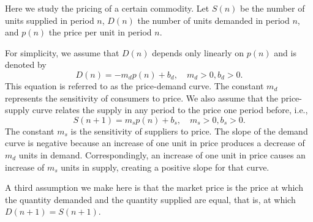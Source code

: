 \begin{eg}
Here we study the pricing of a certain commodity. Let $S(n)$ be the number of units supplied in period $n$, $D(n)$ the number of units demanded in period $n$, and $p(n)$ the price per unit in period $n$.

For simplicity, we assume that $D(n)$ depends only linearly on $p(n)$ and is denoted by
\[
    D(n)=-m_d p(n)+b_d,\quad m_d>0, b_d>0.
\]
This equation is referred to as the price-demand curve. The constant $m_d$ represents the sensitivity of consumers to price. We also assume that the price-supply curve relates the supply in any period to the price one period before, i.e.,
\[
    S(n+1)=m_s p(n)+b_s,\quad m_s>0, b_s>0.
\]
The constant $m_s$ is the sensitivity of suppliers to price. The slope of the demand curve is negative because an increase of one unit in price produces a decrease of $m_d$ units in demand. Correspondingly, an increase of one unit in price causes an increase of $m_s$ units in supply, creating a positive slope for that curve.

A third assumption we make here is that the market price is the price at which the quantity demanded and the quantity supplied are equal, that is, at which $D(n+1)=S(n+1)$.


\end{eg}
